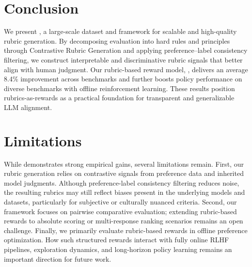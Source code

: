 \section{Conclusion}
\label{sec:conclusion}
\vspace{-0.5ex}
We present \dataset{},  a large-scale dataset and framework for scalable and high-quality rubric generation.
By decomposing evaluation into hard rules and principles through Contrastive Rubric Generation and applying preference–label consistency filtering, we construct interpretable and discriminative rubric signals that better align with human judgment.
Our rubric-based reward model, \modelname{}, delivers an average 8.4\% improvement across benchmarks and further boosts policy performance on diverse benchmarks with offline reinforcement learning. 
These results position rubrics-as-rewards as a practical foundation for transparent and generalizable LLM alignment. 

\section*{Limitations}
While \dataset{} demonstrates strong empirical gains, several limitations remain.
First, our rubric generation relies on contrastive signals from preference data and inherited model judgments. Although preference-label consistency filtering reduces noise, the resulting rubrics may still reflect biases present in the underlying models and datasets, particularly for subjective or culturally nuanced criteria.
Second, our framework focuses on pairwise comparative evaluation; extending rubric-based rewards to absolute scoring or multi-response ranking scenarios remains an open challenge.
Finally, we primarily evaluate rubric-based rewards in offline preference optimization. How such structured rewards interact with fully online RLHF pipelines, exploration dynamics, and long-horizon policy learning remains an important direction for future work.